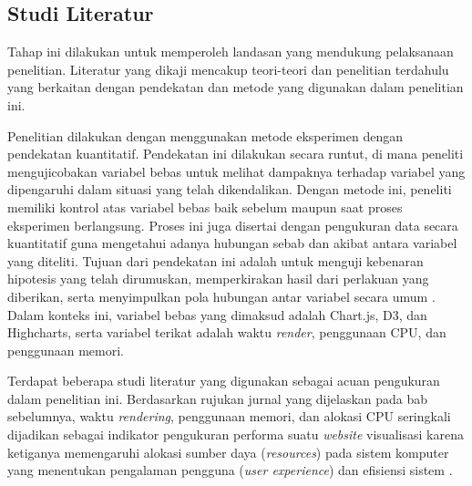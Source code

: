 \subsection{Studi Literatur}
Tahap ini dilakukan untuk memperoleh landasan yang mendukung pelaksanaan penelitian. Literatur yang dikaji mencakup teori-teori dan penelitian terdahulu yang berkaitan dengan pendekatan dan metode yang digunakan dalam penelitian ini. 

Penelitian dilakukan dengan menggunakan metode eksperimen dengan pendekatan kuantitatif. Pendekatan ini dilakukan secara runtut, di mana peneliti mengujicobakan variabel bebas untuk melihat dampaknya terhadap variabel yang dipengaruhi dalam situasi yang telah dikendalikan. Dengan metode ini, peneliti memiliki kontrol atas variabel bebas baik sebelum maupun saat proses eksperimen berlangsung. Proses ini juga disertai dengan pengukuran data secara kuantitatif guna mengetahui adanya hubungan sebab dan akibat antara variabel yang diteliti. Tujuan dari pendekatan ini adalah untuk menguji kebenaran hipotesis yang telah dirumuskan, memperkirakan hasil dari perlakuan yang diberikan, serta menyimpulkan pola hubungan antar variabel secara umum \cite{Akbar}. Dalam konteks ini, variabel bebas yang dimaksud adalah Chart.js, D3, dan Highcharts, serta variabel terikat adalah waktu \textit{render}, penggunaan CPU, dan penggunaan memori.

Terdapat beberapa studi literatur yang digunakan sebagai acuan pengukuran dalam penelitian ini. Berdasarkan rujukan jurnal yang dijelaskan pada bab sebelumnya, waktu \textit{rendering}, penggunaan memori, dan alokasi CPU seringkali dijadikan sebagai indikator pengukuran performa suatu \textit{website} visualisasi karena ketiganya memengaruhi alokasi sumber daya (\textit{resources}) pada sistem komputer yang menentukan pengalaman pengguna (\textit{user experience}) dan efisiensi sistem \cite{Persson2021}\cite{Bostrm2022}\cite{Flask}.

